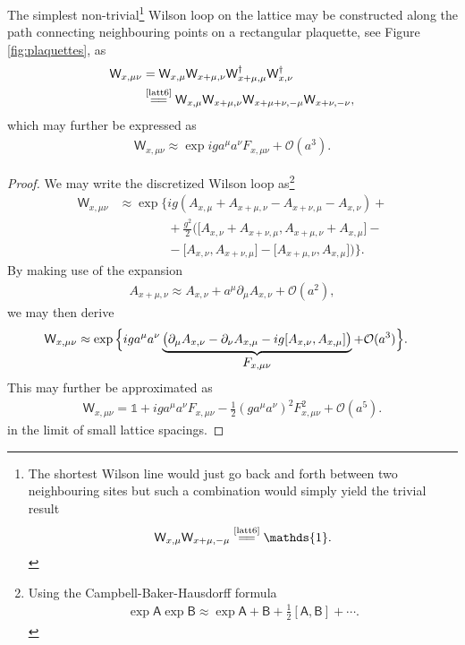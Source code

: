 The simplest non-trivial\footnote{The shortest Wilson line would just go back and forth between two neighbouring sites but such a combination would simply yield the trivial result
\begin{align*}
    \textsf{W}_{x,\mu}\textsf{W}_{x+\mu,-\mu}\stackrel{\text{\cref{latt6}}}{=\joinrel=}\mathds{1}.
\end{align*}
} Wilson loop on the lattice may be constructed along the path connecting neighbouring points on a rectangular {\sffamily\color{maincolor}plaquette}, see Figure \cref{fig:plaquettes}, as
\begin{align*}
    \textsf{W}_{x, \mu \nu}&=\textsf{W}_{x, \mu} \textsf{W}_{x+\mu, \nu} \textsf{W}^\dagger_{x+\mu,\mu}\textsf{W}^\dagger_{x,\nu}\\
    &\stackrel{\text{\cref{latt6}}}{=\joinrel=}\textsf{W}_{x, \mu} \textsf{W}_{x+\mu, \nu} \textsf{W}_{x+\mu+\nu,-\mu} \textsf{W}_{x+\nu,-\nu},
\end{align*}
which may further be expressed as
\begin{align*}
    \textsf{W}_{x, \mu \nu} \approx \exp{ig a^{\mu} a^{\nu} F_{x,\mu \nu}+\mathcal{O}\left(a^{3}\right)}.
\end{align*}

\begin{proof}
We may write the discretized Wilson loop as\footnote{
Using the Campbell-Baker-Hausdorff formula
\begin{align*}
    \exp{\textsf{A}}\exp{\textsf{B}}\approx\exp{\textsf{A}+\textsf{B}+\frac{1}{2}[\textsf{A}, \textsf{B}]+\cdots}.
\end{align*}
}
\begin{align*}
    \textsf{W}_{x,\mu\nu}&\approx\exp\Bigg\{ig(A_{x,\mu}+A_{x+\mu,\nu}-A_{x+\nu,\mu}-A_{x,\nu})+\\
    &\phantom{\approx\exp\Bigg\{}+\frac{g^2}{2}\Big(\big[A_{x,\nu}+A_{x+\nu,\mu},A_{x+\mu,\nu}+A_{x,\mu}\big]-\\
    &\phantom{\approx\exp\Bigg\{}-\big[A_{x,\nu},A_{x+\nu,\mu}\big]-\big[A_{x+\mu,\nu},A_{x,\mu}\big]\Big)\Bigg\}.
\end{align*}
By making use of the expansion 
\begin{align*}
    A_{x+\mu,\nu}\approx A_{x,\nu}+a^\mu\partial_\mu A_{x,\nu}+\mathcal{O}(a^2),   
\end{align*}
we may then derive
\begin{align*}
     \textsf{W}_{x,\mu\nu}&\approx\exp\Big\{iga^\mu a^\nu\underbrace{\big(\partial_\mu A_{x,\nu}-\partial_\nu A_{x,\mu}-ig[A_{x,\nu},A_{x,\mu}]\big)}_{\mathclap{\textstyle F_{x,\mu\nu}}}+\mathcal{O}(a^3)\Big\}.
\end{align*}
This may further be approximated as
\begin{align*}
    \textsf{W}_{x,\mu\nu}=\mathds{1}+ig a^\mu a^\nu F_{x,\mu \nu}-\frac{1}{2}(ga^\mu a^\nu)^2 F_{x,\mu \nu}^2+\mathcal{O}(a^5).
\end{align*}
in the limit of small lattice spacings.
\end{proof}

